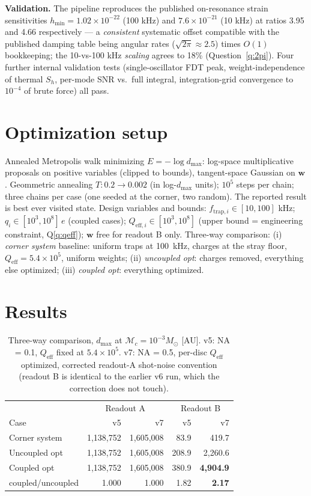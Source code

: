 \documentclass[11pt]{article}
\newcommand{\Mc}{\mathcal{M}_c}
\begin{document}
\textbf{Validation.} The pipeline reproduces the published on-resonance
strain sensitivities $h_{\min} = 1.02\times10^{-22}$ (100 kHz) and
$7.6\times10^{-21}$ (10 kHz) at ratios 3.95 and 4.66 respectively ---
a \emph{consistent} systematic offset compatible with the published
damping table being angular rates ($\sqrt{2\pi}\approx2.5$) times $O(1)$
bookkeeping; the 10-vs-100 kHz \emph{scaling} agrees to 18\%
(Question~\ref{q:2pi}). Four further internal validation tests
(single-oscillator FDT peak, weight-independence of thermal $S_h$,
per-mode SNR vs.\ full integral, integration-grid convergence to
$10^{-4}$ of brute force) all pass.

\section{Optimization setup}
\label{sec:opt}

Annealed Metropolis walk minimizing $E = -\log d_{\max}$: log-space
multiplicative proposals on positive variables (clipped to bounds),
tangent-space Gaussian on $\mathbf{w}$. Geommetric annealing $T: 0.2 \to
0.002$ (in log-$d_{\max}$ units); $10^5$ steps per chain; three chains
per case (one seeded at the corner, two random). The reported result is
best ever visited state. Design variables and bounds:
$f_{\mathrm{trap},i} \in [10,100]$ kHz; $q_i \in [10^3, 10^8]\,e$
(coupled cases); $Q_{\mathrm{eff},i} \in [10^3, 10^8]$ (upper bound =
engineering constraint, Q\ref{q:qeff}); $\mathbf{w}$ free
for readout B only. Three-way comparison: (i) \emph{corner system}
baseline: uniform traps at 100~kHz, charges at the stray
floor, $Q_{\mathrm{eff}} = 5.4\times10^5$, uniform weights; (ii)
\emph{uncoupled opt}: charges removed, everything else optimized; (iii) \emph{coupled opt}:
everything optimized.

\section{Results}
\label{sec:results}

\begin{table}[h]
\centering
\caption{Three-way comparison, $d_{\max}$ at $\Mc = 10^{-3}M_\odot$
[AU]. v5: NA = 0.1, $Q_{\mathrm{eff}}$ fixed at $5.4\times10^5$. v7:
NA = 0.5, per-disc $Q_{\mathrm{eff}}$ optimized, corrected readout-A
shot-noise convention (readout B is identical to the earlier v6 run,
which the correction does not touch).}
\label{tab:results}
\begin{tabular}{@{}lrrrr@{}}
\toprule
 & \multicolumn{2}{c}{Readout A} & \multicolumn{2}{c}{Readout B} \\
Case & v5 & v7 & v5 & v7 \\
\midrule
Corner system  & 1{,}138{,}752 & 1{,}605{,}008 &  83.9 &  419.7 \\
Uncoupled opt  & 1{,}138{,}752 & 1{,}605{,}008 & 208.9 & 2{,}260.6 \\
Coupled opt    & 1{,}138{,}752 & 1{,}605{,}008 & 380.9 & \textbf{4{,}904.9} \\
\midrule
coupled/uncoupled & 1.000 & 1.000 & 1.82 & \textbf{2.17} \\
\bottomrule
\end{tabular}
\end{table}
\end{document}
